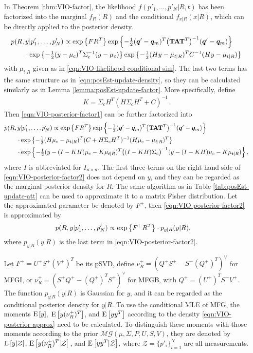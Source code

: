 In Theorem \ref{thm:VIO-factor}, the likelihood $f(p'_1,\ldots,p'_N|R,t)$ has been factorized into the marginal $f_R(R)$ and the conditional $f_{x|R}(x|R)$, which can be directly applied to the posterior density.
\begin{align} \label{eqn:VIO-posterior-factor1}
	&p(R,y|p'_1,\ldots,p'_N) \propto \exp\left\{ FR^T \right\} \exp\left\{ -\tfrac{1}{2}(\bm{q}'-\bm{q}_m)^T \big(\mathbf{T}\mathbf{A}\mathbf{T}^T\big)^{-1} (\bm{q}'-\bm{q}_m) \right\} \nonumber \\
	&\qquad \cdot \exp\left\{ -\tfrac{1}{2}(y-\mu_c)^T \Sigma_c^{-1} (y-\mu_c) \right\} \exp\left\{ -\tfrac{1}{2}(Hy - \mu_{t|R})^T C^{-1} (Hy - \mu_{t|R}) \right\}
\end{align}
with $\mu_{t|R}$ given as in \eqref{eqn:VIO-likelihood-conditional-sim}.
The last two terms has the same structure as in \eqref{eqn:posEst-update-density}, so they can be calculated similarly as in Lemma \ref{lemma:posEst-update-factor}.
More specifically, define
\begin{align}
	K = \Sigma_cH^T(H\Sigma_cH^T + C)^{-1}.
\end{align}
Then \eqref{eqn:VIO-posterior-factor1} can be further factorized into
\begin{align} \label{eqn:VIO-posterior-factor2}
	&p(R,y|p'_1,\ldots,p'_N) \propto \exp\left\{ FR^T \right\} \exp\left\{ -\tfrac{1}{2}(\bm{q}'-\bm{q}_m)^T \big(\mathbf{T}\mathbf{A}\mathbf{T}^T\big)^{-1} (\bm{q}'-\bm{q}_m) \right\} \nonumber \\
	&\qquad \cdot \exp\left\{ -\tfrac{1}{2} (H\mu_c-\mu_{t|R})^T (C + H\Sigma_cH^T)^{-1} (H\mu_c-\mu_{t|R})^T \right\} \nonumber \\
	&\qquad \cdot \exp\left\{ -\tfrac{1}{2} (y-(I-KH)\mu_c-K\mu_{t|R})^T \big((I-KH)\Sigma_c\big)^{-1} (y-(I-KH)\mu_c-K\mu_{t|R}) \right\},
\end{align}
where $I$ is abbreviated for $I_{n\times n}$.
The first three terms on the right hand side of \eqref{eqn:VIO-posterior-factor2} does not depend on $y$, and they can be regarded as the marginal posterior density for $R$.
The same algorithm as in Table \ref{tab:posEst-update-att} can be used to approximate it to a matrix Fisher distribution.
Let the approximated parameter be denoted by $F^+$, then \eqref{eqn:VIO-posterior-factor2} is approximated by
\begin{align} \label{eqn:VIO-posterior-approx}
	&p(R,y|p'_1,\ldots,p'_N) \propto \exp\left\{ F^+R^T \right\} \cdot p_{y|R}(y|R),
\end{align}
where $p_{y|R}(y|R)$ is the last term in \eqref{eqn:VIO-posterior-factor2}.

Let $F^+ = U^+S^+(V^+)^T$ be its pSVD, define $\nu_R^+ = (Q^+S^+ - S^+(Q^+)^T)^\vee$ for MFGI, or $\nu_R^+ = (S^+Q^+ - (Q^+)^TS^+)^\vee$ for MFGB, with $Q^+ = (U^+)^TS^+V^+$.
The function $p_{y|R}(y|R)$ is Gaussian for $y$, and it can be regarded as the conditional posterior density for $y|R$.
To use the conditional MLE of MFG, the moments $\mathrm{E}\left[ y \right]$, $\mathrm{E}\left[ y(\nu_R^+)^T \right]$, and $\mathrm{E}\left[ yy^T \right]$ according to the density \eqref{eqn:VIO-posterior-approx} need to be calculated.
To distinguish these moments with those moments according to the prior $\mathcal{MG}(\mu,\Sigma,P,U,S,V)$, they are denoted by $\mathrm{E}\left[ y|\mathcal{Z} \right]$, $\mathrm{E}\left[ y(\nu_R^+)^T|\mathcal{Z} \right]$, and $\mathrm{E}\left[ yy^T|\mathcal{Z} \right]$, where $\mathcal{Z} = \{p'_i\}_{i=1}^N$ are all measurements.

